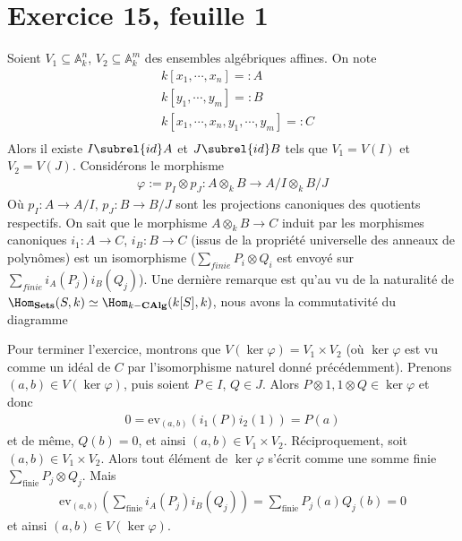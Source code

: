 \documentclass[11pt]{article}
\begin{document}
\section*{Exercice 15, feuille 1}
    Soient $V_1 \subseteq \mathbb{A}_k^n$, $V_2 \subseteq \mathbb{A}_k^m$ des ensembles algébriques affines. On note
    \begin{align*}
        &k[x_1, \cdots, x_n] =: A \\
        &k[y_1, \cdots, y_m] =: B \\
        &k[x_1, \cdots, x_n, y_1, \cdots, y_m] =: C \\
    \end{align*}
    Alors il existe $I \subrel{id} A$ et $J \subrel{id} B$ tels que $V_1 = V(I)$ et $V_2 = V(J)$. Considérons le morphisme
    \begin{align}
        \varphi := p_I \otimes p_J : A \otimes_k B \to A/I \otimes_k B/J
    \end{align}
    Où $p_I : A \to A/I$, $p_J : B \to B/J$ sont les projections canoniques des quotients respectifs. On sait que le morphisme $A \otimes_k B \to C$ induit par les morphismes canoniques $i_1 : A \to C$, $i_B : B \to C$ (issus de la propriété universelle des anneaux de polynômes) est un isomorphisme ($\sum_{finie} P_i \otimes Q_i$ est envoyé sur $\sum_{finie} i_A(P_j)i_B(Q_j)$). Une dernière remarque est qu'au vu de la naturalité de $\Hom_{\mathbf{Sets}}(S,k) \simeq \Hom_{k-\mathbf{CAlg}}(k[S],k)$, nous avons la commutativité du diagramme
    \begin{figure}[H]
        \centering
    \end{figure} \noindent
    Pour terminer l'exercice, montrons que $V(\ker \varphi) = V_1 \times V_2$ (où $\ker \varphi$ est vu comme un idéal de $C$ par l'isomorphisme naturel donné précédemment). Prenons $(a,b) \in V(\ker \varphi)$, puis soient $P \in I$, $Q \in J$. Alors $P \otimes 1, 1 \otimes Q \in \ker \varphi$ et donc
    \begin{align*}
        0 = \mathrm{ev}_{(a,b)}(i_1(P)i_2(1)) =  P(a)
    \end{align*}
    et de même, $Q(b) = 0$, et ainsi $(a,b) \in V_1 \times V_2$. Réciproquement, soit $(a,b) \in V_1 \times V_2$. Alors tout élément de $\ker \varphi$ s'écrit comme une somme finie $\sum_{\mathrm{\mathrm{finie}}} P_j \otimes Q_j$. Mais
    \begin{align*}
        \mathrm{ev}_{(a,b)}\left(\sum_{\mathrm{finie}} i_A(P_j)i_B(Q_j)\right) = \sum_{\mathrm{finie}} P_j(a)Q_j(b) = 0
    \end{align*}
    et ainsi $(a,b) \in V(\ker \varphi)$.
\end{document}
